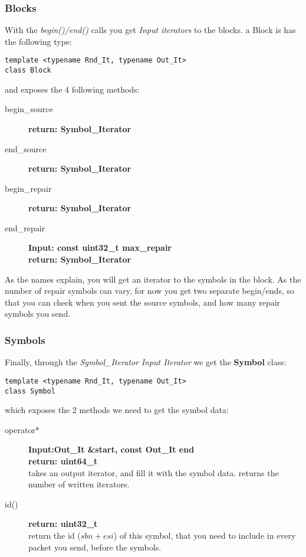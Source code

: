 \documentclass[11pt,a4paper]{refart}
\begin{document}
\subsubsection{Blocks}
With the \textit{begin()/end()} calls you get \textit{Input iterators} to the blocks. a Block is has the following type:
\begin{verbatim}
template <typename Rnd_It, typename Out_It>
class Block
\end{verbatim}

and exposes the 4 following methods:
\begin{description}
\item[begin\_source]\textbf{return: Symbol\_Iterator}
\item[end\_source]\textbf{return: Symbol\_Iterator}
\item[begin\_repair]\textbf{return: Symbol\_Iterator}
\item[end\_repair]\textbf{Input: const uint32\_t max\_repair}\\
\textbf{return: Symbol\_Iterator}
\end{description}

As the names explain, you will get an iterator to the symbols in the block. As the number of repair symbols can vary, for now you get two separate begin/ends,
so that you can check when you sent the source symbols, and how many repair symbols you send.


\subsubsection{Symbols}
Finally, through the \textit{Symbol\_Iterator} \textit{Input Iterator} we get the \textbf{Symbol} class:
\begin{verbatim}
template <typename Rnd_It, typename Out_It>
class Symbol
\end{verbatim}

which exposes the 2 methods we need to get the symbol data:

\begin{description}
\item[operator*]\textbf{Input:Out\_It \&start, const Out\_It end}\\
\textbf{return: uint64\_t}\\
takes an output iterator, and fill it with the symbol data. returns the number of written iterators.
\item[id()]\textbf{return: uint32\_t}\\
return the id (\textit{$sbn + esi$}) of this symbol, that you need to include in every packet you send, before the symbols.
\end{description}
\end{document}
